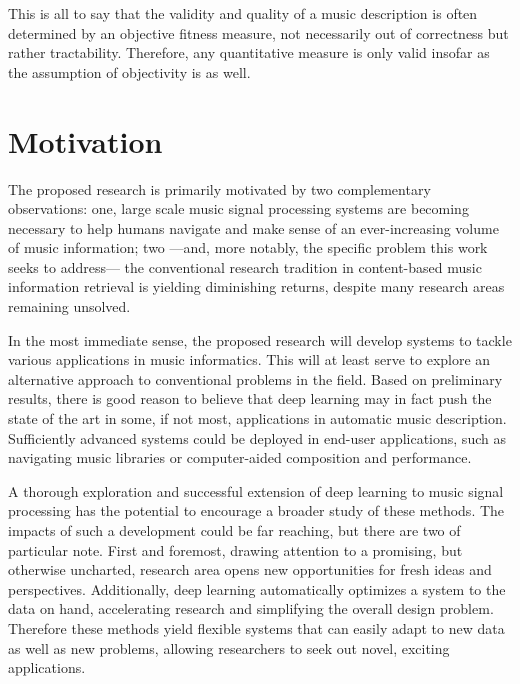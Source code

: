 This is all to say that the validity and quality of a music description is often determined by an objective fitness measure, not necessarily out of correctness but rather tractability.
Therefore, any quantitative measure is only valid insofar as the assumption of objectivity is as well.


\section{Motivation}


The proposed research is primarily motivated by two complementary observations:
one, large scale music signal processing systems are becoming necessary to help humans navigate and make sense of an ever-increasing volume of music information;
two ---and, more notably, the specific problem this work seeks to address--- the conventional research tradition in content-based music information retrieval is yielding diminishing returns, despite many research areas remaining unsolved.

In the most immediate sense, the proposed research will develop systems to tackle various applications in music informatics.
This will at least serve to explore an alternative approach to conventional problems in the field.
Based on preliminary results, there is good reason to believe that deep learning may in fact push the state of the art in some, if not most, applications in automatic music description.
Sufficiently advanced systems could be deployed in end-user applications, such as navigating music libraries or computer-aided composition and performance.

A thorough exploration and successful extension of deep learning to music signal processing has the potential to encourage a broader study of these methods.
The impacts of such a development could be far reaching, but there are two of particular note.
First and foremost, drawing attention to a promising, but otherwise uncharted, research area opens new opportunities for fresh ideas and perspectives.
Additionally, deep learning automatically optimizes a system to the data on hand, accelerating research and simplifying the overall design problem.
Therefore these methods yield flexible systems that can easily adapt to new data as well as new problems, allowing researchers to seek out novel, exciting applications.

